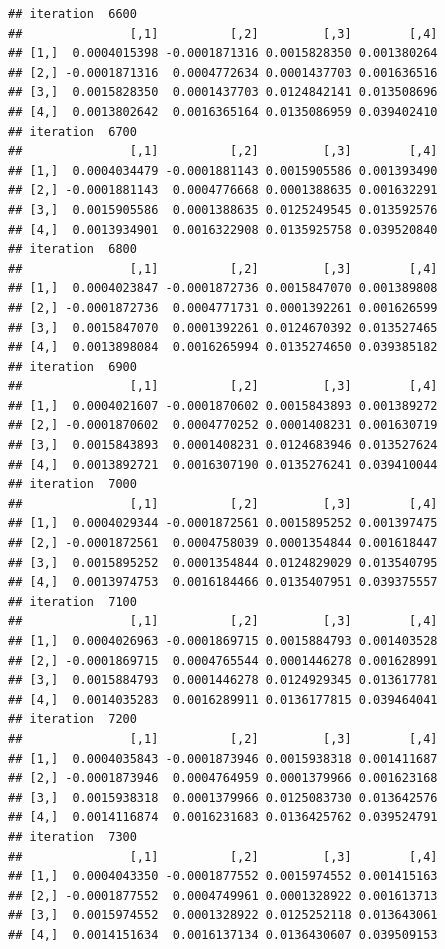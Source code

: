 \documentclass[
]{article}
\begin{document}
\begin{verbatim}
## iteration  6600 
##               [,1]          [,2]         [,3]        [,4]
## [1,]  0.0004015398 -0.0001871316 0.0015828350 0.001380264
## [2,] -0.0001871316  0.0004772634 0.0001437703 0.001636516
## [3,]  0.0015828350  0.0001437703 0.0124842141 0.013508696
## [4,]  0.0013802642  0.0016365164 0.0135086959 0.039402410
## iteration  6700 
##               [,1]          [,2]         [,3]        [,4]
## [1,]  0.0004034479 -0.0001881143 0.0015905586 0.001393490
## [2,] -0.0001881143  0.0004776668 0.0001388635 0.001632291
## [3,]  0.0015905586  0.0001388635 0.0125249545 0.013592576
## [4,]  0.0013934901  0.0016322908 0.0135925758 0.039520840
## iteration  6800 
##               [,1]          [,2]         [,3]        [,4]
## [1,]  0.0004023847 -0.0001872736 0.0015847070 0.001389808
## [2,] -0.0001872736  0.0004771731 0.0001392261 0.001626599
## [3,]  0.0015847070  0.0001392261 0.0124670392 0.013527465
## [4,]  0.0013898084  0.0016265994 0.0135274650 0.039385182
## iteration  6900 
##               [,1]          [,2]         [,3]        [,4]
## [1,]  0.0004021607 -0.0001870602 0.0015843893 0.001389272
## [2,] -0.0001870602  0.0004770252 0.0001408231 0.001630719
## [3,]  0.0015843893  0.0001408231 0.0124683946 0.013527624
## [4,]  0.0013892721  0.0016307190 0.0135276241 0.039410044
## iteration  7000 
##               [,1]          [,2]         [,3]        [,4]
## [1,]  0.0004029344 -0.0001872561 0.0015895252 0.001397475
## [2,] -0.0001872561  0.0004758039 0.0001354844 0.001618447
## [3,]  0.0015895252  0.0001354844 0.0124829029 0.013540795
## [4,]  0.0013974753  0.0016184466 0.0135407951 0.039375557
## iteration  7100 
##               [,1]          [,2]         [,3]        [,4]
## [1,]  0.0004026963 -0.0001869715 0.0015884793 0.001403528
## [2,] -0.0001869715  0.0004765544 0.0001446278 0.001628991
## [3,]  0.0015884793  0.0001446278 0.0124929345 0.013617781
## [4,]  0.0014035283  0.0016289911 0.0136177815 0.039464041
## iteration  7200 
##               [,1]          [,2]         [,3]        [,4]
## [1,]  0.0004035843 -0.0001873946 0.0015938318 0.001411687
## [2,] -0.0001873946  0.0004764959 0.0001379966 0.001623168
## [3,]  0.0015938318  0.0001379966 0.0125083730 0.013642576
## [4,]  0.0014116874  0.0016231683 0.0136425762 0.039524791
## iteration  7300 
##               [,1]          [,2]         [,3]        [,4]
## [1,]  0.0004043350 -0.0001877552 0.0015974552 0.001415163
## [2,] -0.0001877552  0.0004749961 0.0001328922 0.001613713
## [3,]  0.0015974552  0.0001328922 0.0125252118 0.013643061
## [4,]  0.0014151634  0.0016137134 0.0136430607 0.039509153

\end{verbatim}
\end{document}
